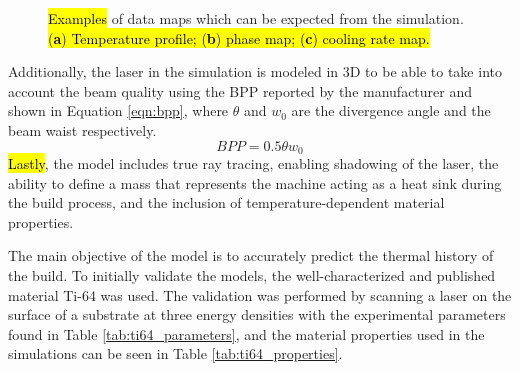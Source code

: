 \documentclass[metals,article,accept,pdftex,moreauthors]{Definitions/mdpi}
\begin{document}
\begin{figure}[H]
\begin{subfigure}[c]{0.3\textwidth}
\caption{\centering }
\end{subfigure}
\caption{\hl{Examples} %
of data maps which can be expected from the simulation. \hl{(\textbf{a}) Temperature 
profile; (\textbf{b}) phase map; (\textbf{c}) cooling rate map.} %
}
\label{fig:data_maps}	
\end{figure}

\clearpage 
Additionally, the laser in the simulation is modeled in 3D to be able to take into account 
the beam quality using the \ac{BPP} reported by the manufacturer and shown in Equation 
\eqref{eqn:bpp}, where $\theta$ and $w_0$ are the divergence angle and the beam waist 
respectively.
\begin{equation}\label{eqn:bpp}
	BPP = 0.5 \theta w_0
\end{equation} 
\hl{Lastly}, the model includes true ray tracing, enabling shadowing of the laser, the 
ability to define a mass that represents the machine acting as a heat sink during the build 
process, and the inclusion of temperature-dependent material properties.


The main objective of the model is to accurately predict the thermal history of the build.  
To initially validate the models, the well-characterized and published material Ti-64 was 
used.  The validation was performed by scanning a laser on the surface of a substrate at 
three energy densities with the experimental parameters found in Table 
\ref{tab:ti64_parameters}, and the material properties used in the simulations can be seen 
in Table \ref{tab:ti64_properties}.
\end{document}

